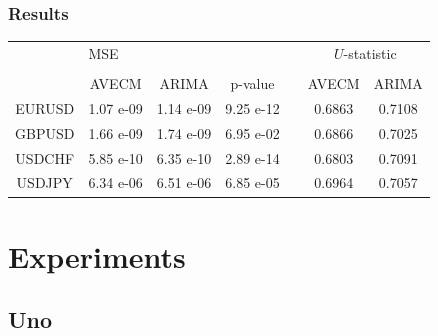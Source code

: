 \documentclass[compress,red]{beamer}
\begin{document}
\begin{frame}
\frametitle{Results}
\begin{tabular}{ccccccc}

& \multicolumn{3}{l}{MSE} & &
\multicolumn{2}{c}{$U$-statistic} \\ 
\hhline{~---~--} \\
 &
AVECM & ARIMA & p-value & &
AVECM & ARIMA \\ 

\hline
 EURUSD & 1.07 e-09 & 1.14 e-09 &  9.25 e-12 & & 0.6863 & 0.7108\\
 GBPUSD & 1.66 e-09 & 1.74 e-09 &  6.95 e-02 & & 0.6866 & 0.7025\\
 USDCHF & 5.85 e-10 & 6.35 e-10 &  2.89 e-14 & & 0.6803 & 0.7091\\
 USDJPY  & 6.34 e-06 & 6.51 e-06 &  6.85 e-05 & & 0.6964 & 0.7057\\
 \end{tabular}
\end{frame}


\section{Experiments}
\subsection{Uno}
\end{document}

